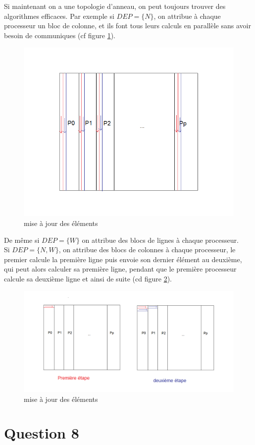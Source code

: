 \documentclass[a4paper,11pt]{article}
\begin{document}
\\
\\
Si maintenant on a une topologie d'anneau, on peut toujours trouver des algorithmes efficaces. Par exemple si $DEP = \{N\}$, on attribue à chaque processeur un bloc de colonne, et ils font tous leurs calculs en parallèle sans avoir besoin de communiques (cf figure \ref{anneau1}).
\begin{figure}[!h]
\includegraphics[scale=0.5]{anneau1.png}
\caption{mise à jour des éléments}
\label{anneau1}
\end{figure}
De même si $DEP = \{W\}$ on attribue des blocs de lignes à chaque processeur.\\
Si $DEP = \{N,W\}$, on attribue des blocs de colonnes à chaque processeur, le premier calcule la première ligne puis envoie son dernier élément au deuxième, qui peut alors calculer sa première ligne, pendant que le première processeur calcule sa deuxième ligne et ainsi de suite (cd figure \ref{anneau2}).
\begin{figure}[!h]
\includegraphics[scale=0.5]{anneau2.png}
\caption{mise à jour des éléments}
\label{anneau2}
\end{figure}

\section*{Question 8}
\end{document}
